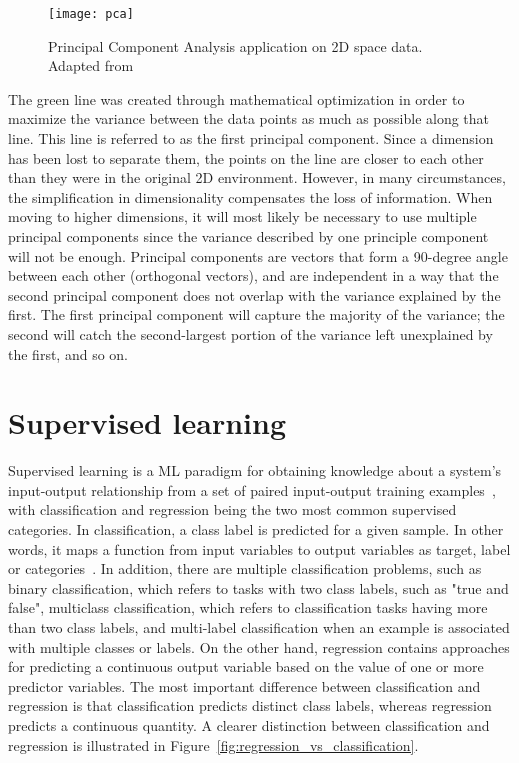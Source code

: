 \begin{figure}[htbp]
    \centering
    \texttt{[image: pca]}
    \caption{Principal Component Analysis application on 2D space data. Adapted from~\cite{Patcher2014WhatDNA}}
    \label{fig:pca}
\end{figure}

The green line was created through mathematical optimization in order to maximize the variance between the data points as much as possible along that line. This line is referred to as the first principal component. Since a dimension has been lost to separate them, the points on the line are closer to each other than they were in the original 2D environment. However, in many circumstances, the simplification in dimensionality compensates the loss of information. When moving to higher dimensions, it will most likely be necessary to use multiple principal components since the variance described by one principle component will not be enough. Principal components are vectors that form a 90-degree angle between each other (orthogonal vectors), and are independent in a way that the second principal component does not overlap with the variance explained by the first. The first principal component will capture the majority of the variance; the second will catch the second-largest portion of the variance left unexplained by the first, and so on.

\section{Supervised learning}

Supervised learning is a \gls{ML} paradigm for obtaining knowledge about a system's input-output relationship from a set of paired input-output training examples~\cite{Liu2012SupervisedLearning}, with classification and regression being the two most common supervised categories. In classification, a class label is predicted for a given sample. In other words, it maps a function from input variables to output variables as target, label or categories~\cite{Sarker2021MachineDirections}.
In addition, there are multiple classification problems, such as binary classification, which refers to tasks with two class labels, such as "true and false", multiclass classification, which refers to classification tasks having more than two class labels, and multi-label classification when an example is associated with multiple classes or labels. On the other hand, regression contains approaches for predicting a continuous output variable based on the value of one or more predictor variables. The most important difference between classification and regression is that classification predicts distinct class labels, whereas regression predicts a continuous quantity. A clearer distinction between classification and regression is illustrated in Figure~\ref{fig:regression_vs_classification}.
    
